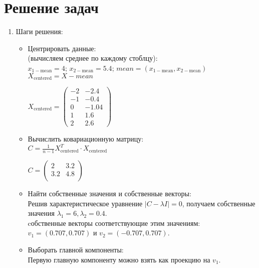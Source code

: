 \section{Решение задач}
\begin{enumerate}
    \item Шаги решения:\\
    \begin{itemize}
    \item Центрировать данные:\\
    (вычисляем среднее по каждому стоблцу):\\
    $x_{1-\text{mean}} = 4$;  $x_{2-\text{mean}} = 5.4$; 
    $mean = (x_{1-\text{mean}}, x_{2-\text{mean}})$    \\
    $X_{\text{centered}} = X - mean$
    \begin{center}
    $X_\text{centered} = 
             \begin{pmatrix}
              -2 &  -2.4 \\
              -1 &  -0.4 \\
              0 &  -1.04 \\
              1 &  1.6 \\
              2 &  2.6 
             \end{pmatrix}$\par
    \end{center}
    \item Вычислить ковариационную матрицу: \\
    $ C = \frac{1}{n-1} X_\text{centered}^T \cdot X_\text{centered}$
    \begin{center}
    $C = 
             \begin{pmatrix}
              2 &  3.2 \\
              3.2 &  4.8 \\
             \end{pmatrix}$\par
    \end{center}
    
   \item Найти собственные значения и собственные векторы: \\
   Решив характеристическое уравнение $ |C - \lambda I| = 0 $, получаем собственные значения $\lambda_1 = 6, \lambda_2 = 0.4$.\\  
   cобственные векторы соответствующие этим значениям:  \\
    $v_1 = (0.707, 0.707)$  и  $v_2 = (-0.707, 0.707)$.
   \item Выборать главной компоненты: \\  
   Первую главную компоненту можно взять как проекцию на  $v_1$.
   \end{itemize}
   

\end{enumerate}
